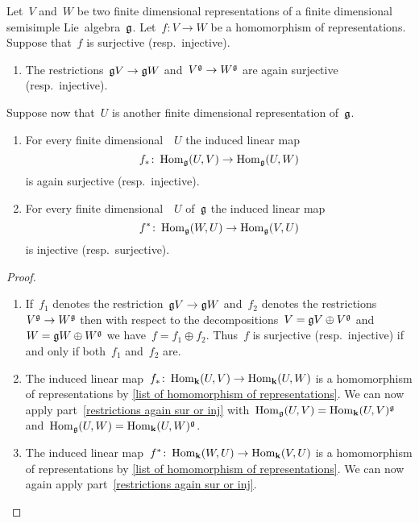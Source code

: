 \begin{corollary}
  \label{everything is projective and injective}
  Let~$V$ and~$W$ be two finite dimensional representations of a finite dimensional semisimple Lie~algebra~$\glie$.
  Let~$f \colon V \to W$ be a homomorphism of representations.
  Suppose that~$f$ is surjective (resp.\ injective).
  \begin{enumerate}
    \item
      \label{restrictions again sur or inj}
      The restrictions~$\mathfrak{g} V \to \mathfrak{g} W$ and~$V^{\mathfrak{g}} \to W^{\mathfrak{g}}$ are again surjective (resp.\ injective).
  \end{enumerate}
  Suppose now that~$U$ is another finite dimensional representation of~$\glie$.
  \begin{enumerate}[resume]
    \item
      \label{everything projective}
      For every finite dimensional~{\representation{$\glie$}}~$U$ the induced linear map
      \[
        f_*
        \colon
        \operatorname{Hom}_{\mathfrak{g}}(U,V)
        \to
        \operatorname{Hom}_{\mathfrak{g}}(U,W)
      \]
      is again surjective (resp.\ injective).
    \item
      \label{everything injective}
      For every finite dimensional~{\representation{$\glie$}}~$U$ of~$\glie$ the induced linear map
      \[
        f^*
        \colon
        \operatorname{Hom}_{\mathfrak{g}}(W,U)
        \to
        \operatorname{Hom}_{\mathfrak{g}}(V,U)
      \]
      is injective (resp.\ surjective).
  \end{enumerate}
\end{corollary}


\begin{proof}
  \leavevmode
  \begin{enumerate}
    \item
      If~$f_1$ denotes the restriction~$\mathfrak{g} V \to \mathfrak{g} W$ and~$f_2$ denotes the restrictions~$V^{\mathfrak{g}} \to W^{\mathfrak{g}}$ then with respect to the decompositions~$V = \mathfrak{g} V \oplus V^{\mathfrak{g}}$ and~$W = \mathfrak{g} W \oplus W^{\mathfrak{g}}$ we have~$f = f_1 \oplus f_2$.
      Thus~$f$ is surjective (resp.\ injective) if and only if both~$f_1$ and~$f_2$ are.
    \item
      The induced linear map~$f_* \colon \operatorname{Hom}_{\mathbf{k}}(U,V) \to \operatorname{Hom}_{\mathbf{k}}(U,W)$ is a homomorphism of representations by \cref{list of homomorphism of representations}.
      We can now apply part~\ref*{restrictions again sur or inj} with~$\operatorname{Hom}_{\mathfrak{g}}(U,V) = \operatorname{Hom}_{\mathbf{k}}(U,V)^{\mathfrak{g}}$ and~$\operatorname{Hom}_{\mathfrak{g}}(U,W) = \operatorname{Hom}_{\mathbf{k}}(U,W)^{\mathfrak{g}}$.
    \item
      The induced linear map~$f^* \colon \operatorname{Hom}_{\mathbf{k}}(W,U) \to \operatorname{Hom}_{\mathbf{k}}(V,U)$ is a homomorphism of representations by \cref{list of homomorphism of representations}.
      We can now again apply part~\ref*{restrictions again sur or inj}.
    \qedhere
  \end{enumerate}
\end{proof}


